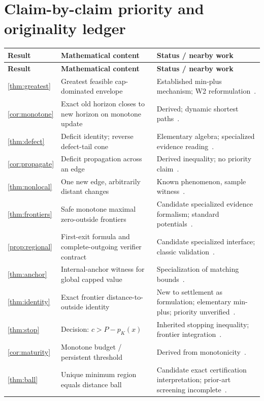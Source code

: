 \documentclass[11pt,letterpaper]{article}
\theoremstyle{definition}
\theoremstyle{remark}
\begin{document}
\section{Claim-by-claim priority and originality ledger}
\small
\begin{longtable}{@{}p{.14\linewidth}p{.47\linewidth}p{.32\linewidth}@{}}
\toprule\textbf{Result}&\textbf{Mathematical content}&\textbf{Status / nearby work}\\\midrule\endfirsthead
\toprule\textbf{Result}&\textbf{Mathematical content}&\textbf{Status / nearby work}\\\midrule\endhead
\ref{thm:greatest}&Greatest feasible cap-dominated envelope&Established min-plus mechanism; W2 reformulation~\cite{Bellman,Mohri}.\\
\ref{cor:monotone}&Exact old horizon closes to new horizon on monotone update&Derived; dynamic shortest paths~\cite{Ramalingam1996,Koenig2004}.\\
\ref{thm:defect}&Deficit identity; reverse defect-tail cone&Elementary algebra; specialized evidence reading~\cite{Mohri,Ramalingam1996}.\\
\ref{cor:propagate}&Deficit propagation across an edge&Derived inequality; no priority claim~\cite{W2}.\\
\ref{thm:nonlocal}&One new edge, arbitrarily distant changes&Known phenomenon, sample witness~\cite{Koenig2004}.\\
\ref{thm:frontiers}&Safe monotone maximal zero-outside frontiers&Candidate specialized evidence formalism; standard potentials~\cite{Lauer2025}.\\
\ref{prop:regional}&First-exit formula and complete-outgoing verifier contract&Candidate specialized interface; classic validation~\cite{Necula,Mugdan2023}.\\
\ref{thm:anchor}&Internal-anchor witness for global capped value&Specialization of matching bounds~\cite{Hart1968}.\\
\ref{thm:identity}&Exact frontier distance-to-outside identity&New to settlement as formulation; elementary min-plus; priority unverified~\cite{Settlement,Mohri}.\\
\ref{thm:stop}&Decision: $c>P-p_K(x)$&Inherited stopping inequality; frontier integration~\cite{W1,Russell1991}.\\
\ref{cor:maturity}&Monotone budget / persistent threshold&Derived from monotonicity~\cite{W2}.\\
\ref{thm:ball}&Unique minimum region equals distance ball&Candidate exact certification interpretation; prior-art screening incomplete~\cite{Hart1968,Mugdan2023}.\\

\end{longtable}
\end{document}
